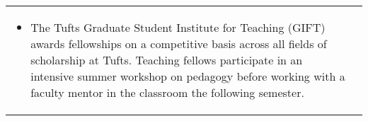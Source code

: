 \begin{center}
{\begin{longtable}{p{}  p{}}
        {\small
        \begin{itemize}
        \setlength{\parindent}{0em}
        \item[] The Tufts Graduate Student Institute for Teaching (GIFT) awards fellowships on a competitive basis across all fields of scholarship at Tufts. Teaching fellows participate in an intensive summer workshop
on pedagogy before working with a faculty mentor in the classroom the following semester.
        \end{itemize}
        }
        \vspace{-1em}
         
    \end{longtable}
    } 
    \end{center}

    \vspace{-1em}
    